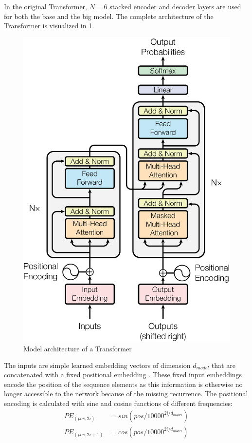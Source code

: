 In the original Transformer, $N = 6$ stacked encoder and decoder layers are used for both the base and the big model.
The complete architecture of the Transformer is visualized in \cref{fig:transformer-model}.

\begin{figure}[h]
\centering
\includegraphics{figures/transformer-model}
\caption[Model architecture of a Transformer]{Model architecture of a Transformer \cite[p.~3]{1706.03762}}
\label{fig:transformer-model}
\end{figure}

The inputs are simple learned embedding vectors of dimension $d_{model}$ that are concatenated with a fixed positional embedding \cite[p.~5--6]{1706.03762}.
These fixed input embeddings encode the position of the sequence elements as this information is otherwise no longer accessible to the network because of the missing recurrence.
The positional encoding is calculated with sine and cosine functions of different frequencies:
\begin{align*} 
	PE_{(pos,2i)} & = sin(pos/10000^{2i/d_{model}}) \\
	PE_{(pos,2i+1)} & = cos(pos/10000^{2i/d_{model}})
\end{align*}

